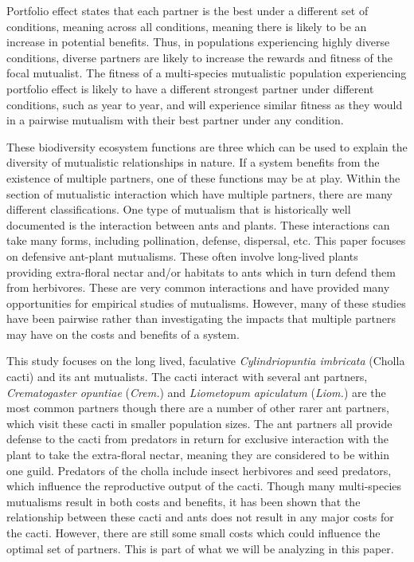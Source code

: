 \documentclass[12pt,a4paper]{article}
\begin{document}
    Portfolio effect states that each partner is the best under a different set of conditions, meaning across all conditions, meaning there is likely to be an increase in potential benefits\cite{Winfree2020}. Thus, in populations experiencing highly diverse conditions, diverse partners are likely to increase the rewards and fitness of the focal mutualist. The fitness of a multi-species mutualistic population experiencing portfolio effect is likely to have a different strongest partner under different conditions, such as year to year, and will experience similar fitness as they would in a pairwise mutualism with their best partner under any condition.  
    
    These biodiversity ecosystem functions are three which can be used to explain the diversity of mutualistic relationships in nature\cite{Afkhami2014}. If a system benefits from the existence of multiple partners, one of these functions may be at play. Within the section of mutualistic interaction which have multiple partners, there are many different classifications. One type of mutualism that is historically well documented is the interaction between ants and plants\cite{Boege2005,Barton2010}. These interactions can take many forms, including pollination, defense, dispersal, etc\cite{Bronstein2006}. This paper focuses on defensive ant-plant mutualisms. These often involve long-lived plants providing extra-floral nectar and/or habitats to ants which in turn defend them from herbivores\cite{Bronstein1998}.  These are very common interactions and have provided many opportunities for empirical studies of mutualisms. However, many of these studies have been pairwise rather than investigating the impacts that multiple partners may have on the costs and benefits of a system. 
    
    This study focuses on the long lived, faculative \textit{Cylindriopuntia imbricata} (Cholla cacti) and its ant mutualists. The cacti interact with several ant partners, \textit{Crematogaster opuntiae} (\textit{Crem.}) and \textit{Liometopum apiculatum} (\textit{Liom.}) are the most common partners though there are a number of other rarer ant partners, which visit these cacti in smaller population sizes. The ant partners all provide defense to the cacti from predators in return for exclusive interaction with the plant to take the extra-floral nectar, meaning they are considered to be within one guild. Predators of the cholla include insect herbivores and seed predators, which influence the reproductive output of the cacti. Though many multi-species mutualisms result in both costs and benefits, it has been shown that the relationship between these cacti and ants does not result in any major costs for the cacti\cite{Miller2007}. However, there are still some small costs which could influence the optimal set of partners. This is part of what we will be analyzing in this paper.
    
\end{document}
